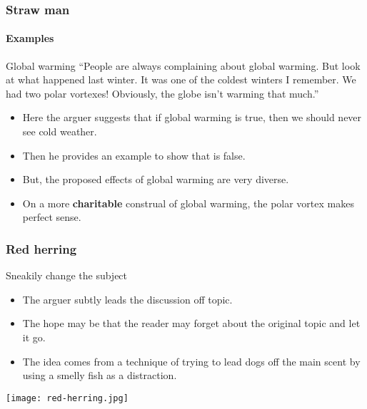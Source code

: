 \documentclass[10pt,letterpaper,xcolor=dvipsnames,handout]{beamer}
\begin{document}
\begin{frame}
  \frametitle{Straw man}
  \framesubtitle{Examples}
  
  \begin{block}{Global warming}
    ``People are always complaining about global warming.  But look at what happened last winter.  It was one of the coldest winters I remember. We had two polar vortexes!  Obviously, the globe isn't warming that much.''
  \end{block}
  
  \begin{itemize}
    \item<2-> Here the arguer suggests that if global warming is true, then we should never see cold weather.
    \item<2-> Then he provides an example to show that is false.
    \item<2-> But, the proposed effects of global warming are very diverse.
    \item<2-> On a more \textbf{charitable} construal of global warming, the polar vortex makes perfect sense. 
  \end{itemize}  
  
\end{frame}

\begin{frame}
  \frametitle{Red herring}
  
  \begin{block}{Sneakily change the subject}
    \begin{itemize}
      \item The arguer subtly leads the discussion off topic.
      \item The hope may be that the reader may forget about the original topic and let it go.
      \item The idea comes from a technique of trying to lead dogs off the main scent by using a smelly fish as a distraction.
    \end{itemize}
  \end{block}
  
  \begin{center}
    \texttt{[image: red-herring.jpg]}
  \end{center}
  
\end{frame}
\end{document}
